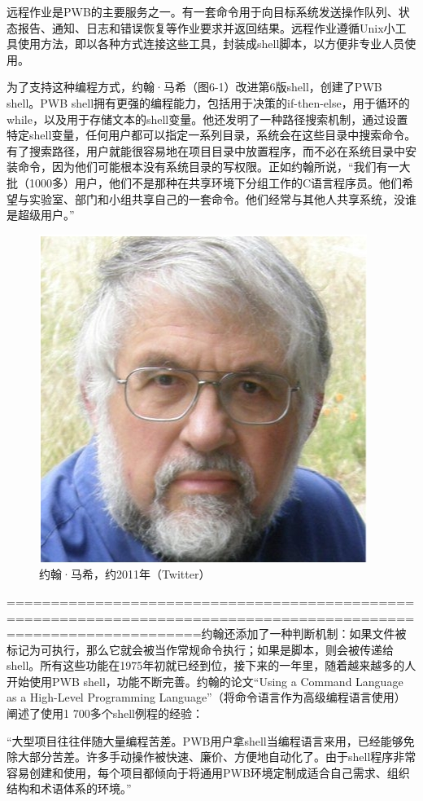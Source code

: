 \documentclass[a4paper,12pt,UTF8,twoside]{ctexbook}
\begin{document}
远程作业是PWB的主要服务之一。有一套命令用于向目标系统发送操作队列、状态报告、通知、日志和错误恢复等作业要求并返回结果。远程作业遵循Unix小工具使用方法，即以各种方式连接这些工具，封装成shell脚本，以方便非专业人员使用。

为了支持这种编程方式，约翰·马希（图6-1）改进第6版shell，创建了PWB shell。PWB shell拥有更强的编程能力，包括用于决策的if-then-else，用于循环的while，以及用于存储文本的shell变量。他还发明了一种路径搜索机制，通过设置特定shell变量，任何用户都可以指定一系列目录，系统会在这些目录中搜索命令。有了搜索路径，用户就能很容易地在项目目录中放置程序，而不必在系统目录中安装命令，因为他们可能根本没有系统目录的写权限。正如约翰所说，“我们有一大批（1000多）用户，他们不是那种在共享环境下分组工作的C语言程序员。他们希望与实验室、部门和小组共享自己的一套命令。他们经常与其他人共享系统，没谁是超级用户。”

\begin{figure}[htbp]
	\centering
	\includegraphics[width=0.7\linewidth]{59}
	\caption{约翰·马希，约2011年（Twitter）}
	\label{fig:1}
\end{figure}

==================================================================================================================约翰还添加了一种判断机制：如果文件被标记为可执行，那么它就会被当作常规命令执行；如果是脚本，则会被传递给shell。所有这些功能在1975年初就已经到位，接下来的一年里，随着越来越多的人开始使用PWB shell，功能不断完善。约翰的论文“Using a Command Language as a High-Level Programming Language”（将命令语言作为高级编程语言使用）阐述了使用1 700多个shell例程的经验：

“大型项目往往伴随大量编程苦差。PWB用户拿shell当编程语言来用，已经能够免除大部分苦差。许多手动操作被快速、廉价、方便地自动化了。由于shell程序非常容易创建和使用，每个项目都倾向于将通用PWB环境定制成适合自己需求、组织结构和术语体系的环境。”
\end{document}
